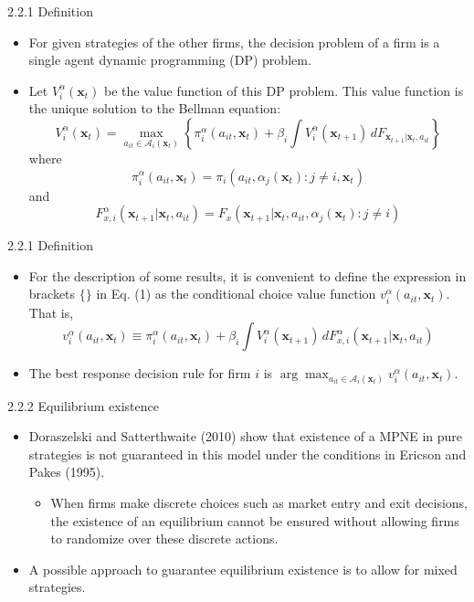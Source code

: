 \documentclass[aspectratio=169]{beamer}  %
\begin{document}
\begin{frame}
{2.2.1 Definition}
\begin{itemize}
    \item For given strategies of the other firms, the decision problem of a firm is a single agent dynamic programming (DP) problem.
    \item Let $V_i^\alpha(\mathbf{x}_t)$ be the value function of this DP problem. This value function is the unique solution to the Bellman equation:
    \begin{equation}\label{}
        V_i^\alpha(\mathbf{x}_t) = \max_{a_{it} \in \mathcal{A}_i(\mathbf{x}_t)} \left\{ \pi_i^\alpha(a_{it}, \mathbf{x}_t) + \beta_i \int V_i^\alpha(\mathbf{x}_{t+1}) \, dF_{\mathbf{x}_{t+1}|\mathbf{x}_t, a_{it}} \right\}
    \end{equation}
    where 
    \[
    \pi_i^\alpha(a_{it}, \mathbf{x}_t) = \pi_i(a_{it}, \alpha_j(\mathbf{x}_t) : j \neq i, \mathbf{x}_t)
    \]
    and 
    \[
    F_{x,i}^\alpha(\mathbf{x}_{t+1}|\mathbf{x}_t, a_{it}) = F_x(\mathbf{x}_{t+1}|\mathbf{x}_t, a_{it}, \alpha_j(\mathbf{x}_t) : j \neq i)
    \]
    \end{itemize}
\end{frame}


\begin{frame}
{2.2.1 Definition}
    \begin{itemize}
        \item For the description of some results, it is convenient to define the expression in brackets \(\{\}\) in Eq. (1) as the conditional choice value function \(v_i^\alpha(a_{it}, \mathbf{x}_t)\). That is,
        \begin{equation}\label{}
            v_i^\alpha(a_{it}, \mathbf{x}_t) \equiv \pi_i^\alpha(a_{it}, \mathbf{x}_t) + \beta_i \int V_i^\alpha(\mathbf{x}_{t+1}) \, dF_{x,i}^\alpha(\mathbf{x}_{t+1}|\mathbf{x}_t, a_{it})
        \end{equation}
        \item The best response decision rule for firm \(i\) is \(\arg\max_{a_{it} \in \mathcal{A}_i(\mathbf{x}_t)} v_i^\alpha(a_{it}, \mathbf{x}_t)\).
    \end{itemize}

\end{frame}


\begin{frame}{2.2.2 Equilibrium existence}
\begin{itemize}
    \item Doraszelski and Satterthwaite (2010) show that existence of a MPNE in pure strategies is not guaranteed in this model under the conditions in Ericson and Pakes (1995).
    \begin{itemize}
        \item When firms make discrete choices such as market entry and exit decisions, the existence of an equilibrium cannot be ensured without allowing firms to randomize over these discrete actions.
    \end{itemize}
    \item A possible approach to guarantee equilibrium existence is to allow for mixed strategies.
\end{itemize}
\end{frame}
\end{document}
